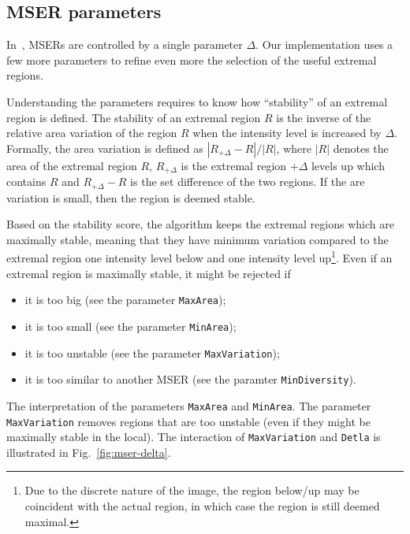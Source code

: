 \documentclass[9.5pt]{article}
\newcommand{\param}[1]{{\color{red}\tt   #1}}
\begin{document}
\subsection{MSER parameters}\label{mser.parameters}

In~\cite{matas03robust}, MSERs are controlled by a single parameter
$\Delta$. Our implementation uses a few more parameters to refine even
more the selection of the useful extremal regions.

Understanding the parameters requires to know how ``stability'' of an
extremal region is defined. The stability of an extremal region $R$ is
the inverse of the relative area variation of the region $R$ when the
intensity level is increased by $\Delta$. Formally, the area variation
is defined as $|R_{+\Delta} - R|/|R|$, where $|R|$ denotes the area of
the extremal region $R$, $R_{+\Delta}$ is the extremal region
$+\Delta$ levels up which contains $R$ and $R_{+\Delta} - R$ is the
set difference of the two regions. If the are variation is small, then
the region is deemed stable.

Based on the stability score, the algorithm keeps the extremal regions
which are maximally stable, meaning that they have minimum variation
compared to the extremal region one intensity level below and one
intensity level up\footnote{Due to the discrete nature of the image,
  the region below/up may be coincident with the actual region, in
  which case the region is still deemed maximal.}. Even if an extremal
region is maximally stable, it might be rejected if
\begin{itemize}
\raggedright
\item it is too big (see the parameter \param{MaxArea});
\item it is too small (see the parameter \param{MinArea});
\item it is too unstable (see the parameter \param{MaxVariation});
\item it is too similar to another MSER (see the
  paramter \param{MinDiversity}).
\end{itemize}

The interpretation of the parameters \param{MaxArea}
and \param{MinArea}. The parameter \verb$MaxVariation$ removes regions
that are too unstable (even if they might be maximally stable in the
local). The interaction of \verb$MaxVariation$ and \verb$Detla$ is
illustrated in Fig.~\ref{fig:mser-delta}.
\end{document}
